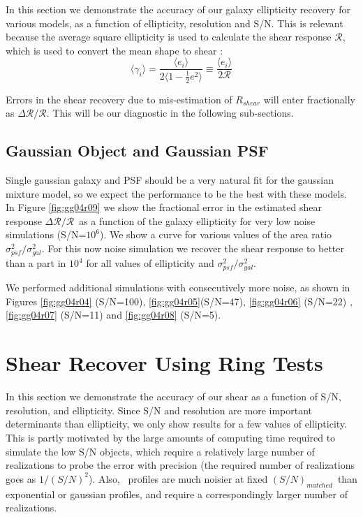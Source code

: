 \documentclass[12pt,preprint]{aastex}
\newcommand{\aratio}{\ensuremath{\sigma^2_{psf}/\sigma^2_{gal}}}
\newcommand{\snmatch}{$(S/N)_{matched}$}
\newcommand{\Rshear}{\ensuremath{\mathcal{R}}}
\newcommand{\rfracerr}{\ensuremath{\Delta \Rshear/\Rshear}}
\begin{document}
In this section we demonstrate the accuracy of our galaxy ellipticity recovery
for various models, as a function of ellipticity, resolution and S/N.  This is
relevant because the average square ellipticity is used to calculate the shear
response \Rshear, which is used to convert the mean shape to shear \citep[e.g.
Equation 5.11,][]{bern02}:
\begin{equation}
\langle \gamma_i \rangle  = \frac{\langle e_i \rangle}{2 \langle 1 - \frac{1}{2} e^2 \rangle } \equiv
  \frac{\langle e_i \rangle}{2 \Rshear} 
\end{equation}

\noindent Errors in the shear recovery due to mis-estimation of $R_{shear}$ will enter
fractionally as \rfracerr.  This will be our
diagnostic in the following sub-sections.

\subsection{Gaussian Object and Gaussian PSF}

Single gaussian galaxy and PSF should be a very natural fit for the gaussian
mixture model, so we expect the performance to be the best with these models.
In Figure \ref{fig:gg04r09} we show the fractional error in the estimated shear
response \rfracerr\ as a function of the galaxy ellipticity for very low noise
simulations (S/N=$10^6$).  We show a curve for various values of the area
ratio \aratio.  For this now noise simulation we recover the shear response to 
better than a part in $10^4$ for all values of ellipticity and \aratio.

We performed additional simulations with consecutively more noise, as shown in
Figures \ref{fig:gg04r04} (S/N=100), \ref{fig:gg04r05}(S/N=47),
\ref{fig:gg04r06} (S/N=22) , \ref{fig:gg04r07} (S/N=11) and \ref{fig:gg04r08}
(S/N=5).


\section{Shear Recover Using Ring Tests}

In this section we demonstrate the accuracy of our shear as a function of S/N,
resolution, and ellipticity.  Since S/N and resolution are more important
determinants than ellipticity, we only show results for a few values of
ellipticity.  This is partly motivated by the large amounts of computing time
required to simulate the low S/N objects, which require a relatively large
number of realizations to probe the error with precision (the
required number of realizations goes as $1/(S/N)^2$).  Also, \devauc\ profiles
are much noisier at fixed \snmatch\ than exponential or gaussian profiles, 
and require a correspondingly larger number of realizations.
\end{document}
